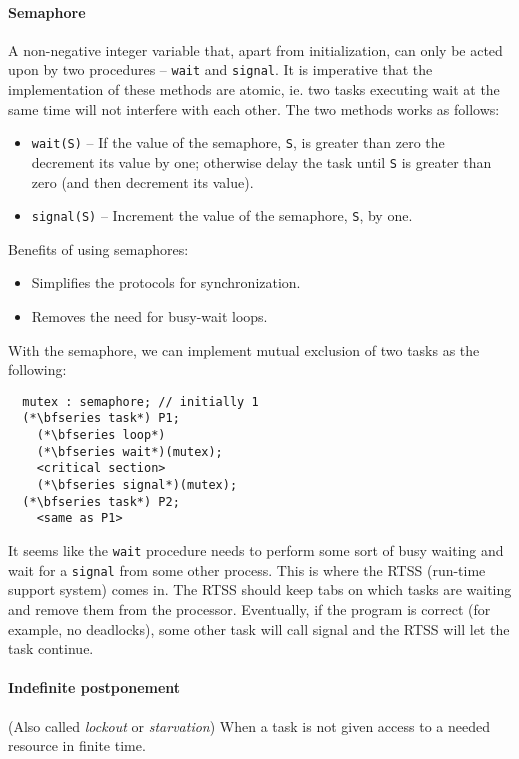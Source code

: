 \paragraph{Semaphore} A non-negative integer variable that, apart from initialization, can only be acted upon by two procedures -- \verb|wait| and \verb|signal|. It is imperative that the implementation of these methods are atomic, ie. two tasks executing wait at the same time will not interfere with each other. The two methods works as follows:
\begin{itemize}[nolistsep,noitemsep]
  \item \verb|wait(S)| -- If the value of the semaphore, \verb|S|, is greater than zero the decrement its value by one; otherwise delay the task until \verb|S| is greater than zero (and then decrement its value).
  \item \verb|signal(S)| -- Increment the value of the semaphore, \verb|S|, by one.
\end{itemize}

Benefits of using semaphores:
\begin{itemize}[nolistsep,noitemsep]
  \item Simplifies the protocols for synchronization.
  \item Removes the need for busy-wait loops.
\end{itemize}

With the semaphore, we can implement mutual exclusion of two tasks as the following:
%
\begin{lstlisting}
  mutex : semaphore; // initially 1
  (*\bfseries task*) P1;
    (*\bfseries loop*)
    (*\bfseries wait*)(mutex);
    <critical section>
    (*\bfseries signal*)(mutex);
  (*\bfseries task*) P2;
    <same as P1>
\end{lstlisting}

It seems like the \verb|wait| procedure needs to perform some sort of busy waiting and wait for a \verb|signal| from some other process. This is where the RTSS (run-time support system) comes in. The RTSS should keep tabs on which tasks are waiting and remove them from the processor. Eventually, if the program is correct (for example, no deadlocks), some other task will call signal and the RTSS will let the task continue.

\paragraph{Indefinite postponement} (Also called \textit{lockout} or \textit{starvation}) When a task is not given access to a needed resource in finite time.

